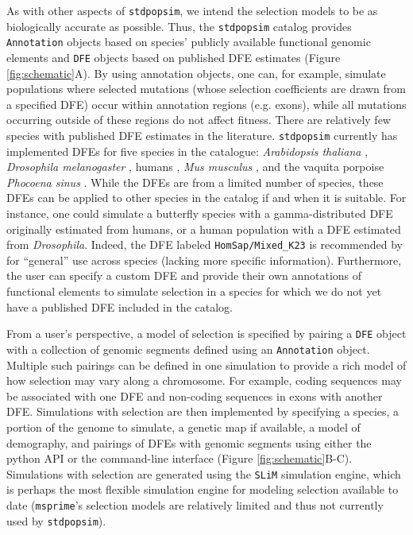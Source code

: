 \documentclass[hidelinks]{article}
\newcommand{\stdpopsim}{\texttt{stdpopsim}\xspace}
\newcommand{\slim}{\texttt{SLiM}\xspace}
\newcommand{\msprime}{\texttt{msprime}\xspace}
\begin{document}
    As with other aspects of \stdpopsim, we intend the selection models to be as biologically accurate as possible.
    Thus, the \stdpopsim catalog provides \texttt{Annotation} objects based on species' publicly available functional genomic elements 
    and \texttt{DFE} objects based on published DFE estimates (Figure \ref{fig:schematic}A).
    By using annotation objects, one can, for example, simulate populations where selected mutations (whose selection
    coefficients are drawn from a specified DFE) occur within annotation regions (e.g. exons), while all mutations
    occurring outside of these regions do not affect fitness.
    There are relatively few species with published DFE estimates in the literature.
    \stdpopsim currently has implemented DFEs for five species in the catalogue:
    \textit{Arabidopsis thaliana} \citep{huber2018gene},
    \textit{Drosophila melanogaster} \citep{ragsdale2016triallelic,huber2017determining,zhen2021greater},
    humans \citep{huber2017determining,kim2017inference,kyriazis2022using,castellano2019compmarison,castellano2019compmarison,rodrigues2024shared},
    \textit{Mus musculus} \citep{booker2021selective},
    and the vaquita porpoise \textit{Phocoena sinus} \citep{robinson2022critically}.
    While the DFEs are from a limited number of species, these DFEs can be applied to other species
    in the catalog if and when it is suitable. 
    For instance, one could simulate a butterfly species with a gamma-distributed DFE originally
    estimated from humans, or a human population with a DFE estimated from \textit{Drosophila}.
    Indeed, the DFE labeled \texttt{HomSap/Mixed\_K23} is recommended by \citet{kyriazis2022using}
    for ``general'' use across species (lacking more specific information).
    Furthermore, the user can specify a custom DFE and provide their own annotations
    of functional elements to simulate selection in a species for which we do not yet have 
    a published DFE included in the catalog.
  
    From a user's perspective, a model of selection is specified by pairing a \texttt{DFE} object
    with a collection of genomic segments defined using an \texttt{Annotation} object.
    Multiple such pairings can be defined in one simulation
    to provide a rich model of how selection may vary along a chromosome.
    For example, coding sequences may be associated with one DFE and non-coding sequences in exons with another DFE.
    Simulations with selection are then implemented by specifying a species, 
    a portion of the genome to simulate,
    a genetic map if available, a model of demography, and pairings of DFEs with genomic segments
    using either the python API or the command-line interface (Figure \ref{fig:schematic}B-C).
    Simulations with selection are generated
    using the \slim simulation engine, which is perhaps
    the most flexible simulation engine for modeling selection available to date
    (\msprime's selection models are relatively limited and thus not currently used by \stdpopsim).
\end{document}
